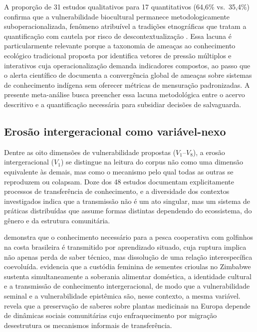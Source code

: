 \documentclass[12pt,a4paper]{article}
\begin{document}
A proporção de 31 estudos qualitativos para 17 quantitativos (64,6\% vs.\ 35,4\%) confirma que a vulnerabilidade biocultural permanece metodologicamente suboperacionalizada, fenômeno atribuível a tradições etnográficas que tratam a quantificação com cautela por risco de descontextualização \citep{Agrawal2002}. Essa lacuna é particularmente relevante porque a taxonomia de ameaças ao conhecimento ecológico tradicional proposta por \citet{TangGavin2016} identifica vetores de pressão múltiplos e interativos cuja operacionalização demanda indicadores compostos, ao passo que o alerta científico de \citet{FernandezLlamazares2021} documenta a convergência global de ameaças sobre sistemas de conhecimento indígena sem oferecer métricas de mensuração padronizadas. A presente meta-análise busca preencher essa lacuna metodológica entre o acervo descritivo e a quantificação necessária para subsidiar decisões de salvaguarda.

\subsection{Erosão intergeracional como variável-nexo}
\label{sec:dimensional-coverage}

Dentre as oito dimensões de vulnerabilidade propostas ($V_1$--$V_8$), a erosão intergeracional ($V_1$) se distingue na leitura do corpus não como uma dimensão equivalente às demais, mas como o mecanismo pelo qual todas as outras se reproduzem ou colapsam. Doze dos 48 estudos documentam explicitamente processos de transferência de conhecimento, e a diversidade dos contextos investigados indica que a transmissão não é um ato singular, mas um sistema de práticas distribuídas que assume formas distintas dependendo do ecossistema, do gênero e da estrutura comunitária.

\citet{Cantor2025} demonstra que o conhecimento necessário para a pesca cooperativa com golfinhos na costa brasileira é transmitido por aprendizado situado, cuja ruptura implica não apenas perda de saber técnico, mas dissolução de uma relação interespecífica coevoluída. \citet{Sibanda2025} evidencia que a custódia feminina de sementes crioulas no Zimbabwe sustenta simultaneamente a soberania alimentar doméstica, a identidade cultural e a transmissão de conhecimento intergeracional, de modo que a vulnerabilidade seminal e a vulnerabilidade epistêmica são, nesse contexto, a mesma variável. \citet{Gerner2025} revela que a preservação de saberes sobre plantas medicinais na Europa depende de dinâmicas sociais comunitárias cujo enfraquecimento por migração desestrutura os mecanismos informais de transferência.
\end{document}
